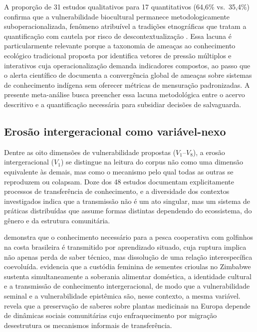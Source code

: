 \documentclass[12pt,a4paper]{article}
\begin{document}
A proporção de 31 estudos qualitativos para 17 quantitativos (64,6\% vs.\ 35,4\%) confirma que a vulnerabilidade biocultural permanece metodologicamente suboperacionalizada, fenômeno atribuível a tradições etnográficas que tratam a quantificação com cautela por risco de descontextualização \citep{Agrawal2002}. Essa lacuna é particularmente relevante porque a taxonomia de ameaças ao conhecimento ecológico tradicional proposta por \citet{TangGavin2016} identifica vetores de pressão múltiplos e interativos cuja operacionalização demanda indicadores compostos, ao passo que o alerta científico de \citet{FernandezLlamazares2021} documenta a convergência global de ameaças sobre sistemas de conhecimento indígena sem oferecer métricas de mensuração padronizadas. A presente meta-análise busca preencher essa lacuna metodológica entre o acervo descritivo e a quantificação necessária para subsidiar decisões de salvaguarda.

\subsection{Erosão intergeracional como variável-nexo}
\label{sec:dimensional-coverage}

Dentre as oito dimensões de vulnerabilidade propostas ($V_1$--$V_8$), a erosão intergeracional ($V_1$) se distingue na leitura do corpus não como uma dimensão equivalente às demais, mas como o mecanismo pelo qual todas as outras se reproduzem ou colapsam. Doze dos 48 estudos documentam explicitamente processos de transferência de conhecimento, e a diversidade dos contextos investigados indica que a transmissão não é um ato singular, mas um sistema de práticas distribuídas que assume formas distintas dependendo do ecossistema, do gênero e da estrutura comunitária.

\citet{Cantor2025} demonstra que o conhecimento necessário para a pesca cooperativa com golfinhos na costa brasileira é transmitido por aprendizado situado, cuja ruptura implica não apenas perda de saber técnico, mas dissolução de uma relação interespecífica coevoluída. \citet{Sibanda2025} evidencia que a custódia feminina de sementes crioulas no Zimbabwe sustenta simultaneamente a soberania alimentar doméstica, a identidade cultural e a transmissão de conhecimento intergeracional, de modo que a vulnerabilidade seminal e a vulnerabilidade epistêmica são, nesse contexto, a mesma variável. \citet{Gerner2025} revela que a preservação de saberes sobre plantas medicinais na Europa depende de dinâmicas sociais comunitárias cujo enfraquecimento por migração desestrutura os mecanismos informais de transferência.
\end{document}
